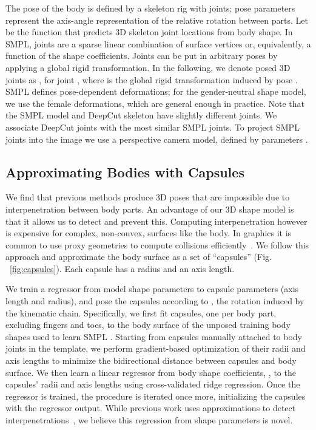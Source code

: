 \documentclass[runningheads]{llncs}
\begin{document}
The pose of the body is defined by a skeleton rig with  joints;
pose parameters  represent the axis-angle representation
of the relative rotation between parts.
Let  be the function that predicts 3D skeleton joint
locations from body shape.
In SMPL, joints are a sparse linear combination of surface vertices
or, equivalently, a function of the shape coefficients.
Joints can be put in arbitrary poses by applying a global rigid transformation.
In the following, we denote posed 3D joints as
, for joint , where  is the global rigid
transformation induced by pose . SMPL defines pose-dependent deformations; for the gender-neutral shape model, we use the female deformations, which are general enough in practice.
Note that the SMPL model and DeepCut skeleton have slightly different joints.
We associate DeepCut joints with the most similar SMPL joints.
To project SMPL joints into the image we use a perspective camera model, defined by parameters .

\subsection{Approximating Bodies with Capsules}
\label{subsec:capsules}
We find that previous methods produce 3D poses that are impossible due
to interpenetration between body parts.
An advantage of our 3D shape model is that  it allows us to detect and prevent this.
Computing interpenetration however is expensive for complex, non-convex, surfaces like the body.
In graphics it is common to use proxy geometries to compute collisions
efficiently~\cite{collision,Thiery:SIGASIA:2013}. We follow this
approach and approximate the body surface as a set of ``capsules'' (Fig. ~\ref{fig:capsules}).
Each capsule has a radius and an axis length.

We train a regressor from model shape parameters to capsule parameters (axis length and radius), and pose the capsules
according to , the rotation induced by the kinematic chain.
Specifically, we first fit  capsules, one per body part, excluding fingers and toes, to
the body surface of the unposed training body shapes used to learn SMPL \cite{SMPL:2015}.
Starting from capsules manually attached to body joints in the
template, we perform gradient-based optimization of their radii and
axis lengths to minimize the bidirectional distance between capsules and
body surface.
We then learn a linear regressor
from body shape coefficients, , to the capsules' radii
and axis lengths using cross-validated ridge regression.
Once the regressor is trained, the procedure is iterated once more, initializing
the capsules with the regressor output.
While previous work uses approximations to detect interpenetrations~\cite{pons2015,sminchisescu2001}, we believe this regression from shape parameters is novel.
\end{document}
